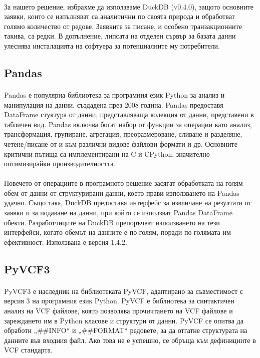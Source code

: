 \documentclass[pdftex,cyrillic,14pt,a4page,twoside,openright]{extreport}
\begin{document}
\paragraph{}
За нашето решение, избрахме да използваме DuckDB (v0.4.0), защото основните заявки, които се изпълняват са аналитични по своята природа и обработват голямо количество от редове. Заявките за писане, и особено транзакционните такива, са редки. В допълнение, липсата на отделен сървър за базата данни улеснява инсталацията на софтуера за потенциалните му потребители.

\subsection{Pandas}
\paragraph{}
Pandas \cite{reback2020pandas} е популярна библиотека за програмния език Python за анализ и манипулация на данни, създадена през 2008 година. Pandas предоставя DataFrame стуктура от данни, представляваща колекция от данни, представени в табличен вид. Pandas включва богат набор от функции за операции като анализ, трансформация, групиране, агрегация, преоразмероване, сливане и разделяне, четене/писане от и към различни видове файлови формати и др. Основните критични пътища са имплементирани на C и CPython, значително оптимизирайки производителността.

\paragraph{}
Повечето от операциите в програмното решение засягат обработката на голям обем от данни от структурирани данни, което прави използването на Pandas удачно. Също така, DuckDB предоставя интерфейс за извличане на резултати от заявки и за подаване на данни, при който се използват Pandas DataFrame обекти. Разработчиците на DuckDB препоръчват използването на тези интерфейси, когато обемът на данните е по-голям, поради по-голямата им ефективност. Използвана е версия 1.4.2.

\subsection{PyVCF3}
\paragraph{}
PyVCF3 \cite{pyvcf3} е наследник на библиотеката PyVCF, адаптирано за съвместимост с версия 3 на програмния език Python. PyVCF е библиотека за синтактичен анализ на VCF файлове, която позволява прочичтането на VCF файлове и зареждането им в Python класове и структури от данни. PyVCF се опитва да обработи „\#\#INFO“ и „\#\#FORMAT“ редовете, за да отгатне структурата на данните във входния файл. Ако това не е успешно, се обръща към дефинициите в VCF стандарта.
\end{document}
